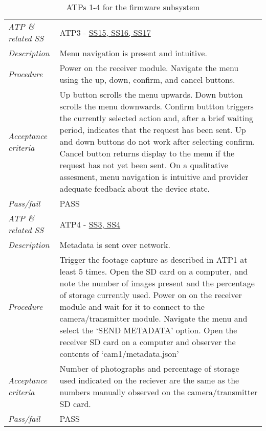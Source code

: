 \documentclass[class=report,11pt,crop=false]{standalone}
\begin{document}
\begin{table}[!ht]
\begin{scriptsize}
\begin{tabularx}{\textwidth}{|p{} X|}
        \textit{ATP \& related SS} &  ATP3 - \hyperlink{tab:firmware-requirements}{SS15, SS16, SS17}\\
        \textit{Description} & Menu navigation is present and intuitive.\\
        \textit{Procedure} & Power on the receiver module. Navigate the menu using the up, down, confirm, and cancel buttons.\\
        \textit{Acceptance criteria} & Up button scrolls the menu upwards. Down button scrolls the menu downwards. Confirm buttton triggers the currently selected action and, after a brief waiting period, indicates that the request has been sent. Up and down buttons do not work after selecting confirm. Cancel button returns display to the menu if the request has not yet been sent. On a qualitative assesment, menu navigation is intuitive and provider adequate feedback about the device state.\\ 
        \textit{Pass/fail} & PASS \\ \hline

        \textit{ATP \& related SS} & ATP4 - \hyperlink{tab:firmware-requirements}{SS3, SS4}\\
        \textit{Description} & Metadata is sent over network.\\
        \textit{Procedure} & Trigger the footage capture as described in ATP1 at least 5 times. Open the SD card on a computer, and note the number of images present and the percentage of storage currently used. Power on on the receiver module and wait for it to connect to the camera/transmitter module. Navigate the menu and select the `SEND METADATA' option. Open the receiver SD card on a computer and observer the contents of `cam1/metadata.json'\\
        \textit{Acceptance criteria} & Number of photographs and percentage of storage used indicated on the reciever are the same as the numbers manually observed on the camera/transmitter SD card. \\ 
        \textit{Pass/fail} & PASS\\ \hline




        

    \end{tabularx}
    \end{scriptsize}
    \caption{ATPs 1-4 for the firmware subsystem}
    \label{tab:firmware-atps1}
\end{table}
\end{document}
